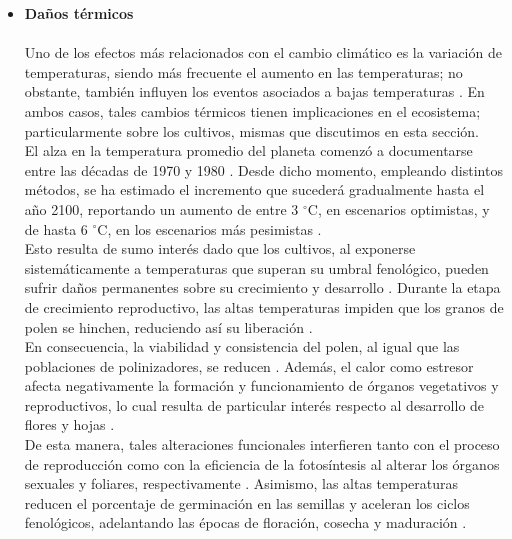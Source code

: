 \begin{itemize}[leftmargin=0cm, itemsep=0.5 cm]
\item[]\textbf{Daños térmicos\\}\\

Uno de los efectos más relacionados con el cambio climático es la variación de temperaturas, siendo más frecuente el aumento en las temperaturas; no obstante, también influyen los eventos asociados a bajas temperaturas \cite{Cohen_2021}. En ambos casos, tales cambios térmicos tienen implicaciones en el ecosistema; particularmente sobre los cultivos, mismas que discutimos en esta sección.\\

El alza en la temperatura promedio del planeta comenzó a documentarse entre las décadas de 1970 y 1980 \cite{Easterling_2024}. Desde dicho momento, empleando distintos métodos, se ha estimado el incremento que sucederá gradualmente hasta el año 2100, reportando un aumento de entre 3 $^\circ$C, en escenarios optimistas, y de hasta 6 $^\circ$C, en los escenarios más pesimistas \cite{Hroub_2025}.\\

Esto resulta de sumo interés dado que los cultivos, al exponerse sistemáticamente a temperaturas que superan su umbral fenológico, pueden sufrir daños permanentes sobre su crecimiento y desarrollo \cite{Hasanuzzaman_2013}. Durante la etapa de crecimiento reproductivo, las altas temperaturas impiden que los granos de polen se hinchen, reduciendo así su liberación \cite{Ngoune_2020}.\\

En consecuencia, la viabilidad y consistencia del polen, al igual que las poblaciones de polinizadores, se reducen \cite{Antle_1993}. Además, el calor como estresor afecta negativamente la formación y funcionamiento de órganos vegetativos y reproductivos, lo cual resulta de particular interés respecto al desarrollo de flores y hojas \cite{Ngoune_2020}.\\

De esta manera, tales alteraciones funcionales interfieren tanto con el proceso de reproducción como con la eficiencia de la fotosíntesis al alterar los órganos sexuales y foliares, respectivamente \cite{Kumaraswamy_2016, Ngoune_2020}. Asimismo, las altas temperaturas reducen el porcentaje de germinación en las semillas y aceleran los ciclos fenológicos, adelantando las épocas de floración, cosecha y maduración \cite{Antle_1993}.\\


\end{itemize}
